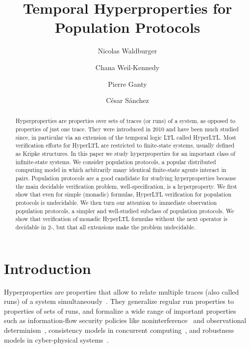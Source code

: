 \documentclass[10pt,a4paper]{article}
\title{Temporal Hyperproperties for Population Protocols}
\author[1]{Nicolas Waldburger}
\author[2]{Chana Weil-Kennedy}
\author[2]{Pierre Ganty}
\author[2]{C\'esar S\'anchez}
\affil[1]{Université de Rennes, IRISA, INRIA, France}
\affil[2]{IMDEA Software Institute, Pozuelo de Alarc\'{o}n, Spain}
\date{}
\begin{document}
\maketitle

\begin{abstract}
	Hyperproperties are properties over sets of traces (or runs) of a system, as opposed to properties of just one trace.
	They were introduced in 2010 and have been much studied since, in particular via an extension of the temporal logic LTL called HyperLTL.
	Most verification efforts for HyperLTL are restricted to finite-state systems, usually defined as Kripke structures.
	In this paper we study hyperproperties for an important class of infinite-state systems.
	We consider population protocols, a popular distributed computing model in which arbitrarily many identical finite-state agents interact in pairs.
	Population protocols are a good candidate for studying hyperproperties because the main decidable verification problem, well-specification, is a hyperproperty.
	We first show that even for simple (monadic) formulas, HyperLTL verification for population protocols is undecidable.
	We then turn our attention to immediate observation population protocols, a simpler and well-studied subclass of population protocols.
	We show that verification of monadic HyperLTL formulas without the next operator is decidable in 2-\EXPSPACE, but that all extensions make the problem undecidable.
\end{abstract}

%

%
%
%
\section{Introduction}
\label{sec:introduction}

Hyperproperties are properties that allow to relate multiple traces (also called runs) of a system simultaneously~\cite{clarkson10hyperproperties}.
%
They generalize regular run properties to properties of sets of runs, and formalize a wide range of important properties such as information-flow security policies like noninterference~\cite{goguen82security,mclean96general} and observational determinism~\cite{zdancewic03observational}, consistency models in concurrent computing~\cite{bonakdarpour18monitoring}, and robustness models in cyber-physical systems~\cite{wang19statistical,bonakdarpour20model}.
\end{document}
